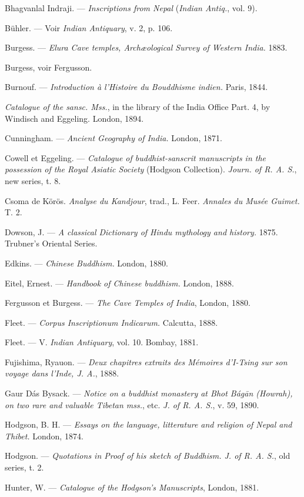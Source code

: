 \documentclass[a4paper, 11pt, oneside, french]{article}
\begin{document}
Bhagvanlal Indraji. --- \emph{Inscriptions from Nepal} (\emph{Indian Antiq.}, vol. 9).

Bühler. --- Voir \emph{Indian Antiquary}, v. 2, p. 106.

Burgess. --- \emph{Elura Cave temples, Archæological Survey of Western India.} 1883.

Burgess, voir Fergusson.

Burnouf. --- \emph{Introduction à l'Histoire du Bouddhisme indien.} Paris, 1844.

\emph{Catalogue of the sansc. Mss.}, in the library of the India Office Part. 4, by Windisch and Eggeling. London, 1894.

Cunningham. --- \emph{Ancient Geography of India.} London, 1871.

Cowell et Eggeling. --- \emph{Catalogue of buddhist-sanscrit manuscripts in the possession of the Royal Asiatic Society} (Hodgson Collection). \emph{Journ. of R. A. S.}, new series, t. 8.

Csoma de Körös. \emph{Analyse du Kandjour}, trad., L. Feer. \emph{Annales du Musée Guimet.} T. 2.

Dowson, J. --- \emph{A classical Dictionary of Hindu mythology and history.} 1875. Trubner's Oriental Series.

Edkins. --- \emph{Chinese Buddhism.} London, 1880.

Eitel, Ernest. --- \emph{Handbook of Chinese buddhism.} London, 1888.

Fergusson et Burgess. --- \emph{The Cave Temples of India}, London, 1880.

Fleet. --- \emph{Corpus Inscriptionum Indicarum.} Calcutta, 1888.

Fleet. --- V. \emph{Indian Antiquary}, vol. 10. Bombay, 1881.

Fujishima, Ryauon. --- \emph{Deux chapitres extraits des Mémoires d'I-Tsing sur son voyage dans l'Inde, J. A.}, 1888.

Gaur Dás Bysack. --- \emph{Notice on a buddhist monastery at Bhot Bág\={a}n (Howrah), on two rare and valuable Tibetan mss.}, etc. \emph{J. of R. A. S.}, v. 59, 1890.

Hodgson, B. H. --- \emph{Essays on the language, litterature and religion of Nepal and Thibet.} London, 1874.

Hodgson. --- \emph{Quotations in Proof of his sketch of Buddhism. J. of R. A. S.}, old series, t. 2.

Hunter, W. --- \emph{Catalogue of the Hodgson's Manuscripts}, London, 1881.
\end{document}
